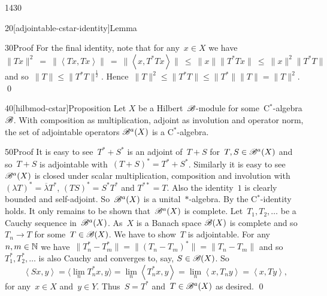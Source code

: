 \begin{parsec}{1430}
\begin{point}{20}[adjointable-cstar-identity]{Lemma}
\begin{point}{30}{Proof}
For the final identity, note that for any~$x \in X$ we have
\begin{equation*}
\|Tx\|^2 \ =\  \|\left<Tx,Tx\right>\| 
            \ =\  \| \left<x, T^*Tx\right>\|
            \ \leq\  \|x \| \|T^*Tx \|
            \ \leq\  \|x\|^2 \|T^*T\|
\end{equation*}
and so~$\|T\| \leq \|T^*T\|^{\frac{1}{2}}$.
Hence~$\|T\|^2 \leq \|T^*T\| \leq \|T^*\|\|T\| = \|T\|^2$.
    \qed
\end{point}
\end{point}
\begin{point}{40}[hilbmod-cstar]{Proposition}%
Let $X$ be a Hilbert~$\mathscr{B}$-module for some~C$^*$-algebra~$\mathscr{B}$.
With composition as multiplication,
    adjoint as involution
    and operator norm,
    the set of adjointable operators
     $\mathscr{B}^a(X)$ is a C$^*$-algebra.
\begin{point}{50}{Proof}
It is easy to see~$T^*+S^*$ is an adjoint of~$T+S$
    for~$T,S \in \mathscr{B}^a(X)$
    and so~$T+S$ is adjointable with~$(T+S)^* = T^*+ S^*$.
    Similarly it is easy to see~$\mathscr{B}^a(X)$
        is closed under scalar multiplication, composition and involution
        with~$(\lambda T)^* = \overline{\lambda} T^* $,
            $(TS)^* = S^*T^*$ and
            $T^{**} =T$.
Also the identity~$1$ is clearly bounded and self-adjoint.
So~$\mathscr{B}^a(X)$ is a unital~$*$-algebra.
By  
    the C$^*$-identity holds.
It only remains to be shown that~$\mathscr{B}^a(X)$ is complete.
Let~$T_1,T_2,\ldots$ be a Cauchy sequence in~$\mathscr{B}^a(X)$.
As~$X$ is a Banach space $\mathscr{B}(X)$ is complete
    and so~$T_n \to T$ for some~$T \in \mathscr{B}(X)$.
We have to show~$T$ is adjointable.
For any~$n,m \in \mathbb{N}$ we have~$\|T_n^* - T_m^*\|
= \|(T_n - T_m)^*\| = \|T_n - T_m\|$
and so~$T^*_1, T^*_2,\ldots$
is also Cauchy
and converges to, say, $S \in \mathscr{B}(X)$.
So
\begin{equation*}
\left<S x, y\right> =
\langle\lim_{n} T^*_n x, y\rangle = \lim_n \left<T_n^* x, y\right>
                = \lim_n \left<x, T_n y\right>
                =  \left<x, T y\right>,
\end{equation*}
for any~$x \in X$ and~$y \in Y$.
Thus~$S = T^*$ and~$T \in \mathscr{B}^a(X)$ as desired. \qed
\end{point}
\end{point}
\end{parsec}

